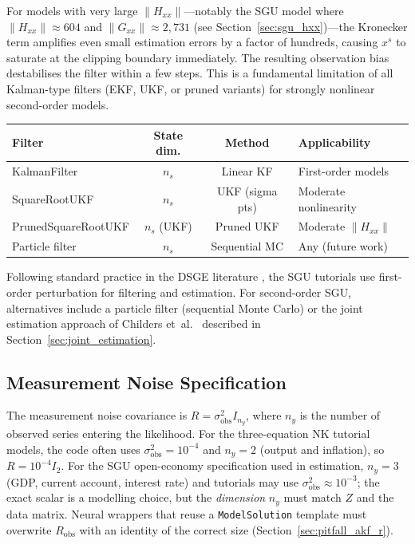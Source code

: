 \documentclass[11pt,a4paper]{article}
\theoremstyle{definition}
\newcommand{\code}[1]{\texttt{\color{codecolor}#1}}
\begin{document}
	For models with very large $\|H_{xx}\|$---notably the SGU model where $\|H_{xx}\| \approx 604$ and $\|G_{xx}\| \approx 2{,}731$ (see Section~\ref{sec:sgu_hxx})---the Kronecker term amplifies even small estimation errors by a factor of hundreds, causing $x^s$ to saturate at the clipping boundary immediately.
	The resulting observation bias destabilises the filter within a few steps.
	This is a fundamental limitation of all Kalman-type filters (EKF, UKF, or pruned variants) for strongly nonlinear second-order models.
	
	\begin{center}
		\begin{tabular}{lccl}
			\toprule
			\textbf{Filter} & \textbf{State dim.} & \textbf{Method} & \textbf{Applicability} \\
			\midrule
			KalmanFilter & $n_s$ & Linear KF & First-order models \\
			SquareRootUKF & $n_s$ & UKF (sigma pts) & Moderate nonlinearity \\
			PrunedSquareRootUKF & $n_s$ (UKF) & Pruned UKF & Moderate $\|H_{xx}\|$ \\
			Particle filter & $n_s$ & Sequential MC & Any (future work) \\
			\bottomrule
		\end{tabular}
	\end{center}
	
	Following standard practice in the DSGE literature \cite{fernandezvillaverde2007estimating}, the SGU tutorials use first-order perturbation for filtering and estimation.
	For second-order SGU, alternatives include a particle filter (sequential Monte Carlo) or the joint estimation approach of Childers et~al.~\cite{childers2024} described in Section~\ref{sec:joint_estimation}.
	
	\subsection{Measurement Noise Specification}
	\label{sec:meas_noise}
	
	The measurement noise covariance is $R = \sigma_{\mathrm{obs}}^2 I_{n_y}$, where $n_y$ is the number of observed series entering the likelihood.
	For the three-equation NK tutorial models, the code often uses $\sigma_{\mathrm{obs}}^2 = 10^{-4}$ and $n_y = 2$ (output and inflation), so $R = 10^{-4} I_2$.
	For the SGU open-economy specification used in estimation, $n_y = 3$ (GDP, current account, interest rate) and tutorials may use $\sigma_{\mathrm{obs}}^2 \approx 10^{-3}$; the exact scalar is a modelling choice, but the \emph{dimension} $n_y$ must match $Z$ and the data matrix.
	Neural wrappers that reuse a \code{ModelSolution} template must overwrite $R_{\mathrm{obs}}$ with an identity of the correct size (Section~\ref{sec:pitfall_akf_r}).
	
\end{document}
